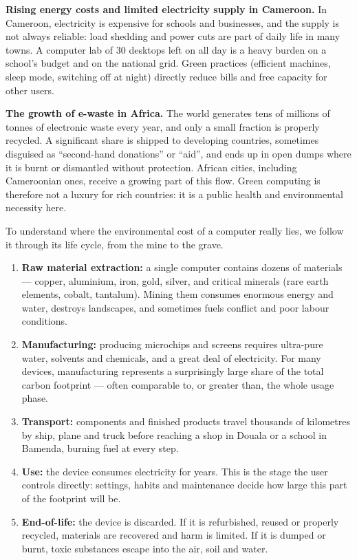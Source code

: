 \documentclass[11pt]{article}
\newcommand{\cle}[1]{{\popxbold\color{popdark}#1}}
\newcounter{popsec}
\newcounter{popsub}
\newcommand{\courssub}[1]{%
  \stepcounter{popsub}%
  \par\vspace{9pt}\noindent{\popxbold\fontsize{11.5}{13}\selectfont\color{popink}{\color{poporange}\thepopsec.\thepopsub}\hspace{6pt}#1}\par\nopagebreak\vspace{4pt}
}
\begin{document}
\textbf{Rising energy costs and limited electricity supply in Cameroon.} In Cameroon, electricity is expensive for schools and businesses, and the supply is not always reliable: load shedding and power cuts are part of daily life in many towns. A computer lab of 30 desktops left on all day is a heavy burden on a school's budget and on the national grid. Green practices (efficient machines, sleep mode, switching off at night) directly reduce bills and free capacity for other users.

\textbf{The growth of e-waste in Africa.} The world generates tens of millions of tonnes of electronic waste every year, and only a small fraction is properly recycled. A significant share is shipped to developing countries, sometimes disguised as ``second-hand donations'' or ``aid'', and ends up in open dumps where it is burnt or dismantled without protection. African cities, including Cameroonian ones, receive a growing part of this flow. Green computing is therefore not a luxury for rich countries: it is a public health and environmental necessity here.

\courssub{The Life Cycle of ICT Equipment}

To understand where the environmental cost of a computer really lies, we follow it through its \cle{life cycle}, from the mine to the grave.

\begin{enumerate}
\item \textbf{Raw material extraction:} a single computer contains dozens of materials --- copper, aluminium, iron, gold, silver, and critical minerals (rare earth elements, cobalt, tantalum). Mining them consumes enormous energy and water, destroys landscapes, and sometimes fuels conflict and poor labour conditions.
\item \textbf{Manufacturing:} producing microchips and screens requires ultra-pure water, solvents and chemicals, and a great deal of electricity. For many devices, manufacturing represents a surprisingly large share of the total carbon footprint --- often comparable to, or greater than, the whole usage phase.
\item \textbf{Transport:} components and finished products travel thousands of kilometres by ship, plane and truck before reaching a shop in Douala or a school in Bamenda, burning fuel at every step.
\item \textbf{Use:} the device consumes electricity for years. This is the stage the user controls directly: settings, habits and maintenance decide how large this part of the footprint will be.
\item \textbf{End-of-life:} the device is discarded. If it is refurbished, reused or properly recycled, materials are recovered and harm is limited. If it is dumped or burnt, toxic substances escape into the air, soil and water.
\end{enumerate}
\end{document}

